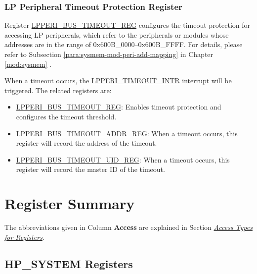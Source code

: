 \documentclass[main\_\_EN.tex]{subfiles}
\begin{document}
\subsubsection{LP Peripheral Timeout Protection Register}

Register \hyperref[regdesc:LPPERIBUSTIMEOUTREG]{LPPERI\_BUS\_TIMEOUT\_REG} configures the timeout protection for accessing LP peripherals, which refer to the peripherals or modules whose addresses are in the range of 0x600B\_0000–0x600B\_FFFF. For details, please refer to Subsection \ref{para:sysmem-mod-peri-add-mapping} \textit{} in Chapter \ref{mod:sysmem} \textit{}.


When a timeout occurs, the \hyperref[tab:peripheral-interrupt-config-status-source]{LPPERI\_TIMEOUT\_INTR} interrupt will be triggered. The related registers are:

\begin{itemize}
    \item \hyperref[regdesc:LPPERIBUSTIMEOUTREG]{LPPERI\_BUS\_TIMEOUT\_REG}: Enables timeout protection and configures the timeout threshold.
    \item \hyperref[regdesc:LPPERIBUSTIMEOUTADDRREG]{LPPERI\_BUS\_TIMEOUT\_ADDR\_REG}: When a timeout occurs, this register will record the address of the timeout.
    \item \hyperref[regdesc:LPPERIBUSTIMEOUTUIDREG]{LPPERI\_BUS\_TIMEOUT\_UID\_REG}: When a timeout occurs, this register will record the master ID of the timeout.
\end{itemize}




\clearpage
\hypertarget{sysreg-reg-summ}{}
\section{Register Summary}
\label{sec:sysreg-reg-summ}

The abbreviations given in Column \textbf{Access} are explained in Section \hyperref[glossary-access-types]{\textit{Access Types for Registers}}.

\subsection{HP\_SYSTEM Registers}
\label{sec:sysreg-reg-summ-sysreg}
\end{document}
